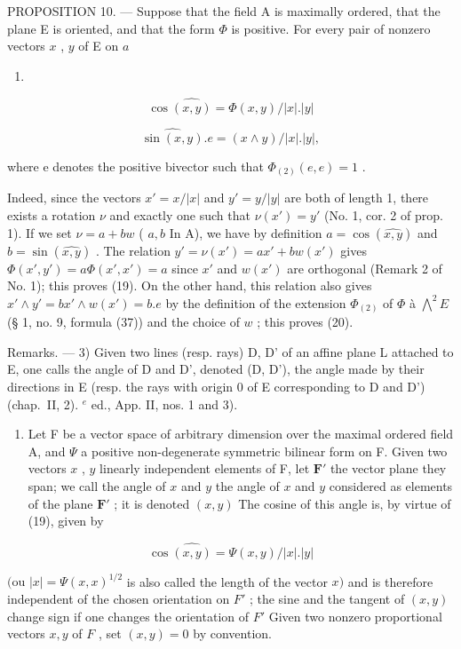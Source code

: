 PROPOSITION 10. --- Suppose that the field A is maximally ordered, that the plane E is oriented, and that the form \(\Phi\) is positive. For every pair of nonzero vectors \(x\) , \(y\) of E on \(a\)

\begin{enumerate}
\def\labelenumi{(\arabic{enumi})}
\setcounter{enumi}{18}
\tightlist
\item
\end{enumerate}

\[
\cos \widehat {(x , y)} = \Phi (x, y) / | x |. | y |\tag{20}
\]

\[
\widehat {\sin (x , y)}. e = (x \wedge y) / | x |. | y |,
\]

where e denotes the positive bivector such that \(\Phi_{(2)}(e, e) = 1\) .

Indeed, since the vectors \(x' = x / |x|\) and \(y' = y / |y|\) are both of length 1, there exists a rotation \(\nu\) and exactly one such that \(\nu(x') = y'\) (No. 1, cor. 2 of prop. 1). If we set \(\nu = a + bw\) ( \(a, b\) In A), we have by definition \(a = \cos(\widehat{x,y})\) and \(b = \sin(\widehat{x,y})\) . The relation \(y' = \nu(x') = ax' + bw(x')\) gives \(\Phi(x', y') = a\Phi(x', x') = a\) since \(x'\) and \(w(x')\) are orthogonal (Remark 2 of No. 1); this proves (19). On the other hand, this relation also gives \(x' \wedge y' = bx' \wedge w(x') = b.e\) by the definition of the extension \(\Phi_{(2)}\) of \(\Phi\) à \(\bigwedge^{2} E\) (§ 1, no. 9, formula (37)) and the choice of \(w\) ; this proves (20).

Remarks. --- 3) Given two lines (resp. rays) D, D' of an affine plane L attached to E, one calls the angle of D and D', denoted (D, D'), the angle made by their directions in E (resp. the rays with origin 0 of E corresponding to D and D') (chap.~II, 2). \(^{e}\) ed., App. II, nos. 1 and 3).

\begin{enumerate}
\def\labelenumi{\arabic{enumi})}
\setcounter{enumi}{3}
\tightlist
\item
  Let F be a vector space of arbitrary dimension over the maximal ordered field A, and \(\Psi\) a positive non-degenerate symmetric bilinear form on F. Given two vectors \(x\) , \(y\) linearly independent elements of F, let \(\mathbf{F}'\) the vector plane they span; we call the angle of \(x\) and \(y\) the angle of \(x\) and \(y\) considered as elements of the plane \(\mathbf{F}'\) ; it is denoted \((x,y)\) The cosine of this angle is, by virtue of (19), given by
\end{enumerate}

\[
\cos \widehat {(x , y)} = \Psi (x, y) / | x |. | y |\tag{21}
\]

\((\text{ou } |x| = \Psi(x, x)^{1/2}\) is also called the length of the vector \(x)\) and is therefore independent of the chosen orientation on \(F'\) ; the sine and the tangent of \((x, y)\) change sign if one changes the orientation of \(F'\) Given two nonzero proportional vectors \(x, y\) of \(F\) , set \((x, y) = 0\) by convention.
